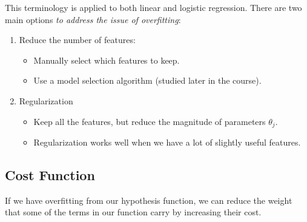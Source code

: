 \documentclass{article}
\begin{document}
This terminology is applied to both linear and logistic regression. There are two main options \textit{to address the issue of overfitting}:
\begin{enumerate}
\item Reduce the number of features:
\begin{itemize}
  \item Manually select which features to keep.
  \item Use a model selection algorithm (studied later in the course).
\end{itemize}

\item Regularization
\begin{itemize}
  \item Keep all the features, but reduce the magnitude of parameters $\theta_j$.
  \item Regularization works well when we have a lot of slightly useful features.
\end{itemize}
\end{enumerate}

\subsection{Cost Function}
If we have overfitting from our hypothesis function, we can reduce the weight that some of the terms in our function carry by increasing their cost.
\end{document}
